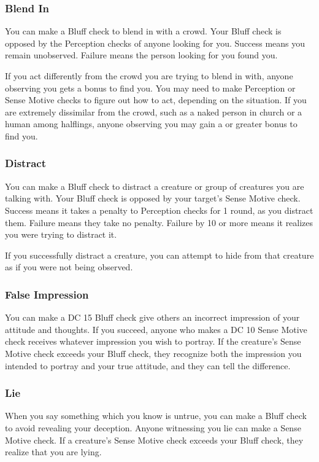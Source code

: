 \subsubsection{Blend In}
You can make a Bluff check to blend in with a crowd. Your Bluff check is opposed by the Perception checks of anyone looking for you. Success means you remain unobserved. Failure means the person looking for you found you.

If you act differently from the crowd you are trying to blend in with, anyone observing you gets a  bonus to find you. You may need to make Perception or Sense Motive checks to figure out how to act, depending on the situation. If you are extremely dissimilar from the crowd, such as a naked person in church or a human among halflings, anyone observing you may gain a  or greater bonus to find you. 

\subsubsection{Distract}
You can make a Bluff check to distract a creature or group of creatures you are talking with. Your Bluff check is opposed by your target's Sense Motive check. Success means it takes a  penalty to Perception checks for 1 round, as you distract them. Failure means they take no penalty. Failure by 10 or more means it realizes you were trying to distract it.

If you successfully distract a creature, you can attempt to hide from that creature as if you were not being observed.

\subsubsection{False Impression}
You can make a DC 15 Bluff check give others an incorrect impression of your attitude and thoughts. If you succeed, anyone who makes a DC 10 Sense Motive check receives whatever impression you wish to portray. If the creature's Sense Motive check exceeds your Bluff check, they recognize both the impression you intended to portray and your true attitude, and they can tell the difference.

\subsubsection{Lie}
When you say something which you know is untrue, you can make a Bluff check to avoid revealing your deception. Anyone witnessing you lie can make a Sense Motive check. If a creature's Sense Motive check exceeds your Bluff check, they realize that you are lying.

